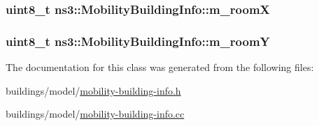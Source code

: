 \subsubsection[{\texorpdfstring{m\+\_\+roomX}{m_roomX}}]{\setlength{\rightskip}{0pt plus 5cm}uint8\+\_\+t ns3\+::\+Mobility\+Building\+Info\+::m\+\_\+roomX\hspace{0.3cm}{\ttfamily [private]}}\hypertarget{classns3_1_1MobilityBuildingInfo_a16d68b8e003aa4754b297c79eb7fdbea}{}\label{classns3_1_1MobilityBuildingInfo_a16d68b8e003aa4754b297c79eb7fdbea}
\subsubsection[{\texorpdfstring{m\+\_\+roomY}{m_roomY}}]{\setlength{\rightskip}{0pt plus 5cm}uint8\+\_\+t ns3\+::\+Mobility\+Building\+Info\+::m\+\_\+roomY\hspace{0.3cm}{\ttfamily [private]}}\hypertarget{classns3_1_1MobilityBuildingInfo_a221bc1e6f3d991a2397c43360a1e1a21}{}\label{classns3_1_1MobilityBuildingInfo_a221bc1e6f3d991a2397c43360a1e1a21}


The documentation for this class was generated from the following files\+:\begin{DoxyCompactItemize}
\item 
buildings/model/\hyperlink{mobility-building-info_8h}{mobility-\/building-\/info.\+h}\item 
buildings/model/\hyperlink{mobility-building-info_8cc}{mobility-\/building-\/info.\+cc}\end{DoxyCompactItemize}
